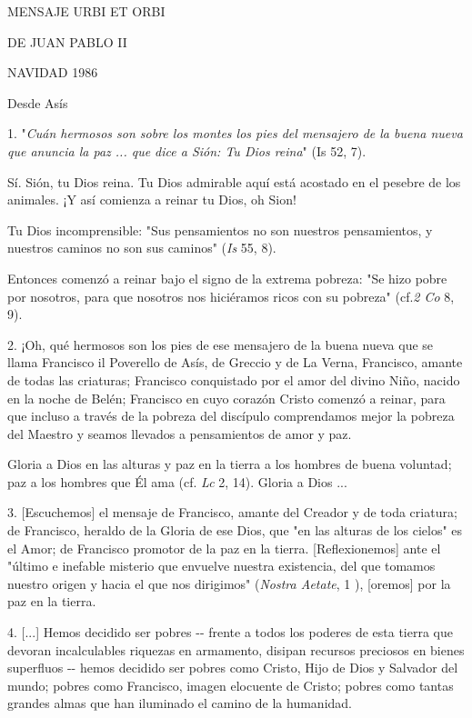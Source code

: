 \begin{body}
MENSAJE URBI ET ORBI

DE JUAN PABLO II

NAVIDAD 1986

Desde Asís

\begin{body} 
1. "\emph{Cuán hermosos son sobre los montes los pies del mensajero de la buena nueva que anuncia la paz ... que dice a Sión: Tu Dios reina}" (Is 52, 7).

Sí. Sión, tu Dios reina. Tu Dios admirable aquí está acostado en el pesebre de los animales. ¡Y así comienza a reinar tu Dios, oh Sion!

Tu Dios incomprensible: "Sus pensamientos no son nuestros pensamientos, y nuestros caminos no son sus caminos" (\emph{Is} 55, 8).

Entonces comenzó a reinar bajo el signo de la extrema pobreza: "Se hizo pobre por nosotros, para que nosotros nos hiciéramos ricos con su pobreza" (cf.\emph{2 Co} 8, 9).

2. ¡Oh, qué hermosos son los pies de ese mensajero de la buena nueva que se llama Francisco il Poverello de Asís, de Greccio y de La Verna, Francisco, amante de todas las criaturas; Francisco conquistado por el amor del divino Niño, nacido en la noche de Belén; Francisco en cuyo corazón Cristo comenzó a reinar, para que incluso a través de la pobreza del discípulo comprendamos mejor la pobreza del Maestro y seamos llevados a pensamientos de amor y paz.

Gloria a Dios en las alturas y paz en la tierra a los hombres de buena voluntad; paz a los hombres que Él ama (cf. \emph{Lc} 2, 14). Gloria a Dios ...

3. {[}Escuchemos{]} el mensaje de Francisco, amante del Creador y de toda criatura; de Francisco, heraldo de la Gloria de ese Dios, que "en las alturas de los cielos" es el Amor; de Francisco promotor de la paz en la tierra. {[}Reflexionemos{]} ante el "último e inefable misterio que envuelve nuestra existencia, del que tomamos nuestro origen y hacia el que nos dirigimos" ({\emph{Nostra Aetate}}, 1 ), {[}oremos{]} por la paz en la tierra.

4. {[}...{]} Hemos decidido ser pobres -\/- frente a todos los poderes de esta tierra que devoran incalculables riquezas en armamento, disipan recursos preciosos en bienes superfluos -\/- hemos decidido ser pobres como Cristo, Hijo de Dios y Salvador del mundo; pobres como Francisco, imagen elocuente de Cristo; pobres como tantas grandes almas que han iluminado el camino de la humanidad.


\end{body}
\end{body}
